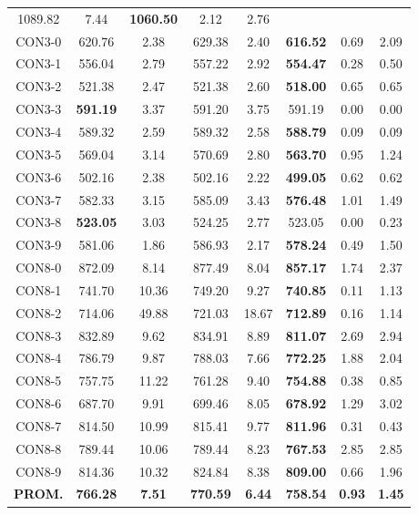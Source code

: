 \begin{table}[h]
\begin{tabular}{c c c c c c c c}
1089.82 & 7.44 & \bf{1060.50} & 
2.12 & 2.76\\CON3-0 & 620.76 & 2.38 & 
629.38 & 2.40 & \bf{616.52} & 
0.69 & 2.09\\CON3-1 & 556.04 & 2.79 & 
557.22 & 2.92 & \bf{554.47} & 
0.28 & 0.50\\CON3-2 & 521.38 & 2.47 & 
521.38 & 2.60 & \bf{518.00} & 
0.65 & 0.65\\CON3-3 & \bf{591.19} & 3.37 & 
591.20 & 3.75 & 591.19 & 0.00
 & 0.00\\CON3-4 & 589.32 & 2.59 & 
589.32 & 2.58 & \bf{588.79} & 
0.09 & 0.09\\CON3-5 & 569.04 & 3.14 & 
570.69 & 2.80 & \bf{563.70} & 
0.95 & 1.24\\CON3-6 & 502.16 & 2.38 & 
502.16 & 2.22 & \bf{499.05} & 
0.62 & 0.62\\CON3-7 & 582.33 & 3.15 & 
585.09 & 3.43 & \bf{576.48} & 
1.01 & 1.49\\CON3-8 & \bf{523.05} & 3.03 & 
524.25 & 2.77 & 523.05 & 0.00
 & 0.23\\CON3-9 & 581.06 & 1.86 & 
586.93 & 2.17 & \bf{578.24} & 
0.49 & 1.50\\CON8-0 & 872.09 & 8.14 & 
877.49 & 8.04 & \bf{857.17} & 
1.74 & 2.37\\CON8-1 & 741.70 & 10.36 & 
749.20 & 9.27 & \bf{740.85} & 
0.11 & 1.13\\CON8-2 & 714.06 & 49.88 & 
721.03 & 18.67 & \bf{712.89} & 
0.16 & 1.14\\CON8-3 & 832.89 & 9.62 & 
834.91 & 8.89 & \bf{811.07} & 
2.69 & 2.94\\CON8-4 & 786.79 & 9.87 & 
788.03 & 7.66 & \bf{772.25} & 
1.88 & 2.04\\CON8-5 & 757.75 & 11.22 & 
761.28 & 9.40 & \bf{754.88} & 
0.38 & 0.85\\CON8-6 & 687.70 & 9.91 & 
699.46 & 8.05 & \bf{678.92} & 
1.29 & 3.02\\CON8-7 & 814.50 & 10.99 & 
815.41 & 9.77 & \bf{811.96} & 
0.31 & 0.43\\CON8-8 & 789.44 & 10.06 & 
789.44 & 8.23 & \bf{767.53} & 
2.85 & 2.85\\CON8-9 & 814.36 & 10.32 & 
824.84 & 8.38 & \bf{809.00} & 
0.66 & 1.96\\\bf{PROM.} & 
\bf{766.28} & \bf{7.51} & \bf{770.59} & \bf{6.44} & \bf{758.54} & \bf{0.93} & \bf{1.45}\\[1ex]\hline
\end{tabular}
\label{table:SS-M-100-0.1}
\end{table}

